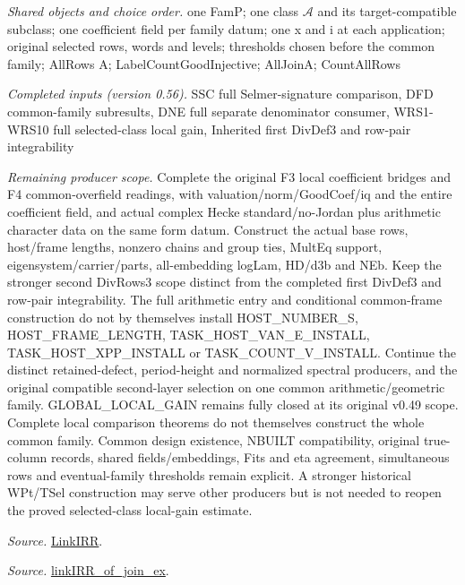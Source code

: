 \documentclass[11pt,a4paper]{article}
\numberwithin{equation}{section}
\theoremstyle{remark}\newtheorem{remark}[theorem]{Remark}
\begin{document}
\emph{Shared objects and choice order.} one FamP; one class $\mathcal A$ and its target-compatible subclass; one coefficient field per family datum; one x and i at each application; original selected rows, words and levels; thresholds chosen before the common family; AllRows A; LabelCountGoodInjective; AllJoinA; CountAllRows

\emph{Completed inputs (version 0.56).} SSC full Selmer-signature comparison, DFD common-family subresults, DNE full separate denominator consumer, WRS1-WRS10 full selected-class local gain, Inherited first DivDef3 and row-pair integrability

\emph{Remaining producer scope.} Complete the original F3 local coefficient bridges and F4 common-overfield readings, with valuation/norm/GoodCoef/iq and the entire coefficient field, and actual complex Hecke standard/no-Jordan plus arithmetic character data on the same form datum. Construct the actual base rows, host/frame lengths, nonzero chains and group ties, MultEq support, eigensystem/carrier/parts, all-embedding logLam, HD/d3b and NEb. Keep the stronger second DivRows3 scope distinct from the completed first DivDef3 and row-pair integrability. The full arithmetic entry and conditional common-frame construction do not by themselves install HOST\_\allowbreak NUMBER\_\allowbreak S, HOST\_\allowbreak FRAME\_\allowbreak LENGTH, TASK\_\allowbreak HOST\_\allowbreak VAN\_\allowbreak E\_\allowbreak INSTALL, TASK\_\allowbreak HOST\_\allowbreak XPP\_\allowbreak INSTALL or TASK\_\allowbreak COUNT\_\allowbreak V\_\allowbreak INSTALL. Continue the distinct retained-defect, period-height and normalized spectral producers, and the original compatible second-layer selection on one common arithmetic/geometric family. GLOBAL\_\allowbreak LOCAL\_\allowbreak GAIN remains fully closed at its original v0.49 scope. Complete local comparison theorems do not themselves construct the whole common family. Common design existence, NBUILT compatibility, original true-column records, shared fields/embeddings, Fits and eta agreement, simultaneous rows and eventual-family thresholds remain explicit. A stronger historical WPt/TSel construction may serve other producers but is not needed to reopen the proved selected-class local-gain estimate.

\emph{Source.} \href{https://github.com/CocoSgt/riemann-hypothesis-lean/blob/7cbf7a0c32fca1badf05931879a37c3f8a2b03b4/src/Formalism/SharpRestriction/GlobalTheoremInputs.lean#L55-L58}{LinkIRR}.

\emph{Source.} \href{https://github.com/CocoSgt/riemann-hypothesis-lean/blob/7cbf7a0c32fca1badf05931879a37c3f8a2b03b4/src/Development/AbelianVarietyTheory/Proofs/GlobalInterpolation/LinkIRROfJoinEx.lean#L17-L38}{linkIRR\_\allowbreak of\_\allowbreak join\_\allowbreak ex}.
\end{document}
